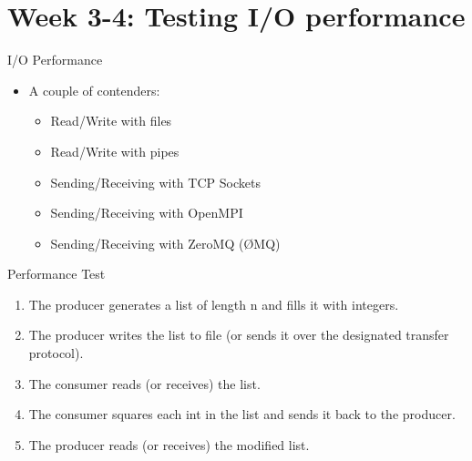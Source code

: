 \documentclass{beamer}
\begin{document}
    \section{Week 3-4: Testing I/O performance}

    \begin{frame}{I/O Performance}
    \begin{itemize}[<+->]
        \item A couple of contenders:
            \begin{itemize}
                \item Read/Write with files
                \item Read/Write with pipes
                \item Sending/Receiving with TCP Sockets
                \item Sending/Receiving with OpenMPI
                \item Sending/Receiving with ZeroMQ (ØMQ)
            \end{itemize}
    \end{itemize}
    \end{frame}
    \begin{frame}{Performance Test}
        \begin{enumerate}[<+->]
            \item The producer generates a list of length n and fills it with
                  integers.
            \item The producer writes the list to file (or sends it over the
                  designated transfer protocol).
            \item The consumer reads (or receives) the list.
            \item The consumer squares each int in the list and sends it back
                  to the producer.
            \item The producer reads (or receives) the modified list.
        \end{enumerate}
    \end{frame}
\end{document}

